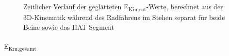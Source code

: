\documentclass[
  letterpaper,
  DIV=11]{scrartcl}
\makeatletter
\let\oldparagraph\paragraph
\renewcommand{\paragraph}{
    \@ifstar
      \xxxParagraphStar
      \xxxParagraphNoStar
  }
\newcommand{\xxxParagraphStar}[1]{\oldparagraph*{#1}\mbox{}}
\newcommand{\xxxParagraphNoStar}[1]{\oldparagraph{#1}\mbox{}}
\makeatother
\begin{document}
\begin{figure}


\caption{\label{fig-PInt_Kinematik_HAT_Ekin_rot_stehen}Zeitlicher
Verlauf der geglätteten E\textsubscript{Kin,rot}-Werte, berechnet aus
der 3D-Kinematik während des Radfahrens im Stehen separat für beide
Beine sowie das HAT Segment}

\end{figure}%

\paragraph{\texorpdfstring{E\textsubscript{Kin,gesamt}}{EKin,gesamt}}
\end{document}

